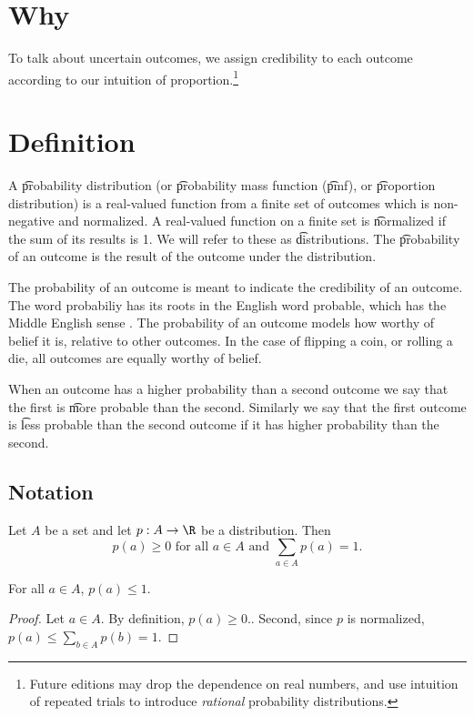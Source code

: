 

\section*{Why}

To talk about uncertain outcomes, we assign credibility to each outcome according to our intuition of proportion.\footnote{Future editions may drop the dependence on real numbers, and use intuition of repeated trials to introduce \textit{rational} probability distributions.}

\section*{Definition}

A \t{probability distribution} (or \t{probability mass function} (\t{pmf}), or \t{proportion distribution}) is a real-valued function from a finite set of outcomes which is non-negative and normalized.
A real-valued function on a finite set is \t{normalized} if the sum of its results is 1.
We will refer to these as \t{distributions}.
The \t{probability of an outcome} is the result of the outcome under the distribution.

The probability of an outcome is meant to indicate the credibility of an outcome.
The word probabiliy has its roots in the English word probable, which has the Middle English sense .
The probability of an outcome models how worthy of belief it is, relative to other outcomes.
In the case of flipping a coin, or rolling a die, all outcomes are equally worthy of belief.

When an outcome has a higher probability than a second outcome we say that the first is \t{more probable} than the second.
Similarly we say that the first outcome is \t{less probable} than the second outcome if it has higher probability than the second.

\subsection*{Notation}

Let $A$ be a set and let $p: A \to \R $ be a distribution.
Then
    \[
\textstyle
p(a) \geq 0 \text{ for all } a \in A \text{ and } \sum_{a \in A} p(a) = 1.
    \]

\begin{proposition}
For all $a \in A$, $p(a) \leq 1$.
\begin{proof}Let $a \in A$.
By definition, $p(a) \geq 0$..
Second, since $p$ is normalized, $p(a) \leq \sum_{b \in A} p(b) = 1$.\end{proof}\end{proposition}
